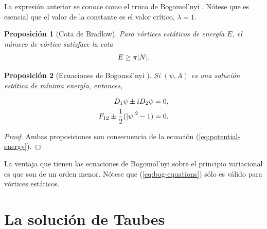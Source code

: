 \documentclass[spanish]{amsart}
\newtheorem{proposition}{Proposición}
\newcommand*{\bog}{Bogomol'nyi{ }}
\begin{document}
La expresión anterior se conoce como el truco de \bog
\cite{Bogomolny}. Nótese que es 
esencial que el valor de la constante es el valor crítico, \(\lambda =
1\). 

\begin{proposition}[Cota de Bradlow]
  Para vórtices estáticos de energía \(E \), el número de vórtice
  satisface la cota
  \[
E \geq \pi \abs{N}.
  \]
\end{proposition}

\begin{proposition}[Ecuaciones de \bog]
  Si \((\psi, A) \) es una solución estática de mínima energía,
  entonces,
  
\begin{equation}
  \label{eq:bog-equations}  
\begin{split}
D_1\psi \pm iD_2\psi &= 0,\\
F_{12} \pm \frac{1}{2}(\abs{\psi}^2 - 1) &= 0.
\end{split}
\end{equation}
\end{proposition}

\begin{proof}
Ambas proposiciones son consecuencia de la ecuación (\ref{eq:potential-energy}).
\end{proof}

La ventaja que tienen las ecuaciones de \bog sobre el principio
variacional es que son de un orden menor. Nótese que
(\ref{eq:bog-equations}) sólo es válido para vórtices estáticos. 

\section{La solución de Taubes}
\label{sec:taubes-equation}
\end{document}

